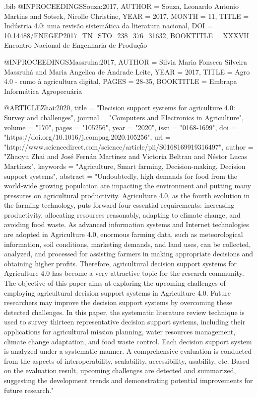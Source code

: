 \begin{filecontents}{\jobname.bib}
@INPROCEEDINGS{Souza:2017,
  AUTHOR = {Souza, Leonardo Antonio Martins and Sotsek, Nicolle Christine},
  YEAR = {2017},
  MONTH = {11},
  TITLE = {Indústria 4.0: uma revisão sistemática da literatura nacional},
  DOI = {10.14488/ENEGEP2017_TN_STO_238_376_31632},
  BOOKTITLE = {XXXVII Encontro Nacional de Engenharia de Produção}
}

@INPROCEEDINGS{Massruha:2017,
  AUTHOR = {Silvia Maria Fonseca Silveira Massruhá and Maria Angelica de Andrade Leite},
  YEAR = {2017},
  TITLE = {Agro 4.0 - rumo à agricultura digital},
  PAGES = {28-35},
  BOOKTITLE = {Embrapa Informática Agropecuária}
}

@ARTICLE{Zhai:2020,
  title = "Decision support systems for agriculture 4.0: Survey and challenges",
  journal = "Computers and Electronics in Agriculture",
  volume = "170",
  pages = "105256",
  year = "2020",
  issn = "0168-1699",
  doi = "https://doi.org/10.1016/j.compag.2020.105256",
  url = "http://www.sciencedirect.com/science/article/pii/S0168169919316497",
  author = "Zhaoyu Zhai and José Fernán Martínez and Victoria Beltran and Néstor Lucas Martínez",
  keywords = "Agriculture, Smart farming, Decision-making, Decision support systems",
  abstract = "Undoubtedly, high demands for food from the world-wide growing population are impacting the environment and putting many pressures on agricultural productivity. Agriculture 4.0, as the fourth evolution in the farming technology, puts forward four essential requirements: increasing productivity, allocating resources reasonably, adapting to climate change, and avoiding food waste. As advanced information systems and Internet technologies are adopted in Agriculture 4.0, enormous farming data, such as meteorological information, soil conditions, marketing demands, and land uses, can be collected, analyzed, and processed for assisting farmers in making appropriate decisions and obtaining higher profits. Therefore, agricultural decision support systems for Agriculture 4.0 has become a very attractive topic for the research community. The objective of this paper aims at exploring the upcoming challenges of employing agricultural decision support systems in Agriculture 4.0. Future researchers may improve the decision support systems by overcoming these detected challenges. In this paper, the systematic literature review technique is used to survey thirteen representative decision support systems, including their applications for agricultural mission planning, water resources management, climate change adaptation, and food waste control. Each decision support system is analyzed under a systematic manner. A comprehensive evaluation is conducted from the aspects of interoperability, scalability, accessibility, usability, etc. Based on the evaluation result, upcoming challenges are detected and summarized, suggesting the development trends and demonstrating potential improvements for future research."
}


\end{filecontents}
